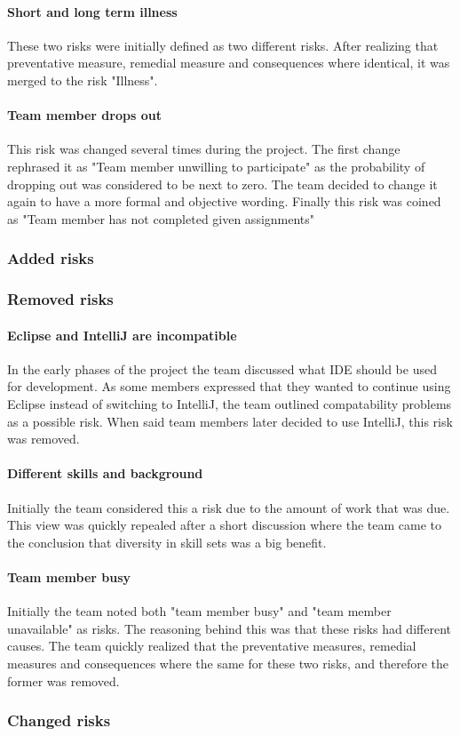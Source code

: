 \paragraph{Short and long term illness}
These two risks were initially defined as two different risks. After realizing that preventative measure, remedial measure and consequences where identical, it was merged to the risk "Illness".

\paragraph{Team member drops out}
This risk was changed several times during the project. The first change rephrased it as "Team member unwilling to participate" as the probability of dropping out was considered to be next to zero. The team decided to change it again to have a more formal and objective wording. Finally this risk was coined as "Team member has not completed given assignments"

\subsubsection{Added risks}

\subsubsection{Removed risks}
\paragraph{Eclipse and IntelliJ are incompatible}
In the early phases of the project the team discussed what IDE should be used for development. As some members expressed that they wanted to continue using Eclipse instead of switching to IntelliJ, the team outlined compatability problems as a possible risk. When said team members later decided to use IntelliJ, this risk was removed.

\paragraph{Different skills and background}
Initially the team considered this a risk due to the amount of work that was due. This view was quickly repealed after a short discussion where the team came to the conclusion that diversity in skill sets was a big benefit.

\paragraph{Team member busy}
Initially the team noted both "team member busy" and "team member unavailable" as risks. The reasoning behind this was that these risks had different causes. The team quickly realized that the preventative measures, remedial measures and consequences where the same for these two risks, and therefore the former was removed. 

\subsubsection{Changed risks}
